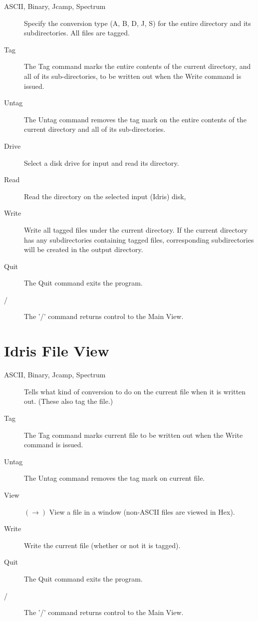 \begin{description}
\item[ASCII, Binary, Jcamp, Spectrum] \nl
            Specify the conversion type (A, B, D, J, S) for the entire
            directory and its subdirectories.  All files are tagged.
\item[Tag] \nl
            The Tag command marks the entire contents of the current
            directory, and all of its sub-directories, to be written
            out when the Write command is issued.
\item[Untag] \nl
            The Untag command removes the tag mark on the entire contents
            of the current directory and all of its sub-directories.
\item[Drive] \nl
            Select a disk drive for input and read its directory.
\item[Read] \nl
            Read the directory on the selected input (Idris) disk,
\item[Write] \nl
            Write all tagged files under the current directory.  If the
	    current directory has any subdirectories containing tagged
files, corresponding subdirectories will be created in the output
directory.
\item[Quit] \nl
            The Quit command exits the program.
\item[/] \nl
            The '/' command returns control to the Main View.
\end{description}


\section{Idris File View}

\begin{description}
\item[ASCII, Binary, Jcamp, Spectrum] \nl
            Tells what kind of conversion to do on the current file
            when it is written out.  (These also tag the file.)
\item[Tag] \nl
            The Tag command marks current file to be written out
            when the Write command is issued.
\item[Untag] \nl
            The Untag command removes the tag mark on current file.
\item[View] $(\rightarrow)$ \nl
            View a file in a window (non-ASCII files are viewed in Hex).
\item[Write] \nl
            Write the current file (whether or not it is tagged).
\item[Quit] \nl
            The Quit command exits the program.
\item[/] \nl
            The '/' command returns control to the Main View.
\end{description}


